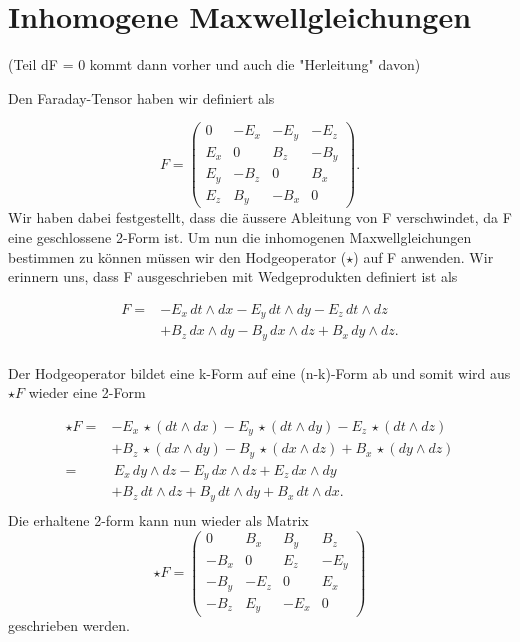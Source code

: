 %
%
%
%
\section{Inhomogene Maxwellgleichungen
	\label{maxwell:section:InhomogeneMaxwellgleichungen}}
(Teil dF = 0 kommt dann vorher und auch die "Herleitung" davon)

Den Faraday-Tensor haben wir definiert als

\begin{equation}
	F = \begin{pmatrix}
		0 & -E_x & -E_y & -E_z \\ E_x & 0 & B_z & -B_y \\ E_y & -B_z & 0 & B_x \\ E_z & B_y & -B_x & 0 
	\end{pmatrix}.
\end{equation}
Wir haben dabei festgestellt, dass die äussere Ableitung von F verschwindet, da F eine geschlossene 2-Form ist.
Um nun die inhomogenen Maxwellgleichungen bestimmen zu können müssen wir den Hodgeoperator ($\star$) auf F anwenden.
Wir erinnern uns, dass F ausgeschrieben mit Wedgeprodukten definiert ist als

\begin{align*}
	F = 
	&- E_x \, dt \wedge dx - E_y \, dt \wedge dy - E_z \, dt \wedge dz \\
	&+ B_z \, dx \wedge dy - B_y \, dx \wedge dz + B_x \, dy \wedge dz.\\
\end{align*}

Der Hodgeoperator bildet eine k-Form auf eine (n-k)-Form ab und somit wird aus $\star F$ wieder eine 2-Form

\begin{align*}
	\star F =
	& - E_{x} \, \star(dt \wedge dx) - E_{y} \, \star(dt \wedge dy) - E_{z} \, \star(dt \wedge dz) \\
	& + B_z \, \star(dx \wedge dy) - B_y \, \star(dx \wedge dz) + B_x \, \star(dy \wedge dz)\\
	= 
	& \, E_{x} \, dy \wedge dz - E_{y} \, dx \wedge dz + E_{z} \, dx \wedge dy \\
	& + B_z \, dt \wedge dz + B_y \, dt \wedge dy + B_x \, dt \wedge dx.\\
\end{align*}
Die erhaltene 2-form kann nun wieder als Matrix
\begin{equation}
	\star F = \begin{pmatrix}
		0 & B_x & B_y & B_z \\ -B_x & 0 & E_z & -E_y \\ -B_y & -E_z & 0 & E_x \\ -B_z & E_y & -E_x & 0 
	\end{pmatrix}
\end{equation}
geschrieben werden.

